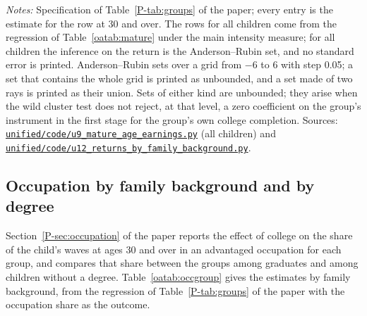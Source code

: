 \documentclass[11pt]{article}
\numberwithin{equation}{section}
\newcommand{\repourl}{https://github.com/JiachenJin1001/before-the-labor-market-or-inside-it}
\newcommand{\code}[1]{\href{\repourl/blob/main/#1}{\nolinkurl{#1}}}
\begin{document}
\begin{table}[H]
\centering
\small
\caption{Returns to college for all children and by family background, with unweighted and
with weighted rows.}
\label{oatab:groups}
\setlength{\tabcolsep}{4pt}
\resizebox{\ifdim\width>\textwidth\textwidth\else\width\fi}{!}{}
\par\smallskip
\begin{minipage}{0.94\textwidth}
\footnotesize\emph{Notes:} Specification of Table~\ref{P-tab:groups} of
the paper; every entry is the estimate for the row at 30 and over. The rows for all children come from the regression of Table~\ref{oatab:mature} under the main intensity measure; for all children the inference on the return is the Anderson--Rubin set, and no standard error is printed.
Anderson--Rubin sets over a grid from $-6$ to 6 with step 0.05; a set that contains the whole grid is printed as unbounded, and a set made of two rays is printed as their union. Sets of either kind are unbounded; they arise when the wild cluster test does not reject, at that level, a zero coefficient on the group's instrument in the first stage for the group's own college completion. Sources: \code{unified/code/u9_mature_age_earnings.py} (all children) and \code{unified/code/u12_returns_by_family_background.py}.
\end{minipage}
\end{table}

\subsection{Occupation by family background and by degree}
\label{oa:occgroup}

Section~\ref{P-sec:occupation} of the paper reports the effect of college on the share of the child's waves at ages 30 and over in an advantaged occupation for each group, and compares that share between the groups among graduates and among children without a degree. Table~\ref{oatab:occgroup} gives the estimates by family background, from the regression of Table~\ref{P-tab:groups} of the paper with the occupation share as the outcome. 
\end{document}
